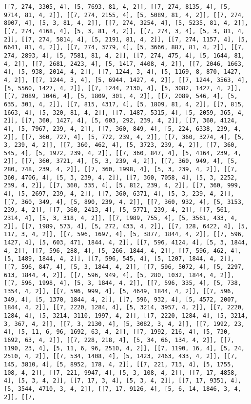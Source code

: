 \documentclass[12pt,fleqn]{article}\usepackage{../../common}
\begin{document}
\begin{verbatim}
[[7, 274, 3305, 4], [5, 7693, 81, 4, 2]], [[7, 274, 8135, 4], [5, 9714, 81, 4, 2]], [[7, 274, 2155, 4], [5, 5089, 81, 4, 2]], [[7, 274, 8907, 4], [5, 3, 81, 4, 2]], [[7, 274, 3254, 4], [5, 5235, 81, 4, 2]], [[7, 274, 4168, 4], [5, 3, 81, 4, 2]], [[7, 274, 3, 4], [5, 3, 81, 4, 2]], [[7, 274, 5814, 4], [5, 2191, 81, 4, 2]], [[7, 274, 1157, 4], [5, 6641, 81, 4, 2]], [[7, 274, 3779, 4], [5, 3666, 887, 81, 4, 2]], [[7, 274, 2893, 4], [5, 7581, 81, 4, 2]], [[7, 274, 475, 4], [5, 1644, 81, 4, 2]], [[7, 2681, 2423, 4], [5, 1417, 4408, 4, 2]], [[7, 2046, 1663, 4], [5, 938, 2014, 4, 2]], [[7, 1244, 3, 4], [5, 1169, 8, 870, 1427, 4, 2]], [[7, 1244, 3, 4], [5, 6944, 1427, 4, 2]], [[7, 1244, 3563, 4], [5, 5560, 1427, 4, 2]], [[7, 1244, 2130, 4], [5, 3082, 1427, 4, 2]], [[7, 2089, 1046, 4], [5, 1809, 301, 4, 2]], [[7, 2089, 546, 4], [5, 635, 301, 4, 2]], [[7, 815, 4317, 4], [5, 1809, 81, 4, 2]], [[7, 815, 1663, 4], [5, 320, 81, 4, 2]], [[7, 1487, 5315, 4], [5, 2059, 365, 4, 2]], [[7, 360, 1427, 4], [5, 603, 292, 239, 4, 2]], [[7, 360, 4124, 4], [5, 7967, 239, 4, 2]], [[7, 360, 849, 4], [5, 224, 6338, 239, 4, 2]], [[7, 360, 727, 4], [5, 772, 239, 4, 2]], [[7, 360, 3274, 4], [5, 3, 239, 4, 2]], [[7, 360, 462, 4], [5, 3723, 239, 4, 2]], [[7, 360, 545, 4], [5, 1972, 239, 4, 2]], [[7, 360, 847, 4], [5, 4164, 239, 4, 2]], [[7, 360, 3721, 4], [5, 3, 239, 4, 2]], [[7, 360, 949, 4], [5, 280, 748, 239, 4, 2]], [[7, 360, 1998, 4], [5, 3, 239, 4, 2]], [[7, 360, 4706, 4], [5, 3, 239, 4, 2]], [[7, 360, 7058, 4], [5, 3, 2252, 239, 4, 2]], [[7, 360, 335, 4], [5, 812, 239, 4, 2]], [[7, 360, 999, 4], [5, 2697, 239, 4, 2]], [[7, 360, 6371, 4], [5, 3, 239, 4, 2]], [[7, 360, 349, 4], [5, 890, 239, 4, 2]], [[7, 360, 932, 4], [5, 3153, 239, 4, 2]], [[7, 360, 2413, 4], [5, 5771, 239, 4, 2]], [[7, 561, 2314, 4], [5, 3, 318, 4, 2]], [[7, 1989, 755, 4], [5, 3561, 433, 4, 2]], [[7, 1989, 573, 4], [5, 272, 433, 4, 2]], [[7, 128, 6422, 4], [5, 117, 3, 4, 2]], [[7, 596, 1697, 4], [5, 3877, 1844, 4, 2]], [[7, 596, 1427, 4], [5, 603, 471, 1844, 4, 2]], [[7, 596, 4124, 4], [5, 3, 1844, 4, 2]], [[7, 596, 288, 4], [5, 266, 1844, 4, 2]], [[7, 596, 462, 4], [5, 1489, 1844, 4, 2]], [[7, 596, 545, 4], [5, 1207, 1844, 4, 2]], [[7, 596, 847, 4], [5, 3, 1844, 4, 2]], [[7, 596, 5072, 4], [5, 2297, 613, 1844, 4, 2]], [[7, 596, 949, 4], [5, 280, 1032, 1844, 4, 2]], [[7, 596, 1998, 4], [5, 3, 1844, 4, 2]], [[7, 596, 335, 4], [5, 738, 1354, 4, 2]], [[7, 596, 999, 4], [5, 4649, 1844, 4, 2]], [[7, 596, 349, 4], [5, 1370, 1844, 4, 2]], [[7, 596, 932, 4], [5, 4572, 2007, 1844, 4, 2]], [[7, 2220, 1284, 4], [5, 3214, 3957, 4, 2]], [[7, 2220, 1284, 4], [5, 3214, 3110, 1997, 4, 2]], [[7, 2220, 1284, 4], [5, 3214, 3, 367, 4, 2]], [[7, 3, 2130, 4], [5, 3082, 3, 4, 2]], [[7, 1992, 23, 4], [5, 11, 6, 96, 1692, 63, 4, 2]], [[7, 1992, 216, 4], [5, 730, 1692, 63, 4, 2]], [[7, 228, 218, 4], [5, 34, 66, 134, 4, 2]], [[7, 1190, 23, 4], [5, 11, 6, 96, 2510, 4, 2]], [[7, 1190, 16, 4], [5, 24, 2510, 4, 2]], [[7, 534, 1408, 4], [5, 1423, 2463, 433, 4, 2]], [[7, 145, 3810, 4], [5, 8952, 178, 4, 2]], [[7, 221, 713, 4], [5, 1755, 108, 4, 2]], [[7, 221, 9947, 4], [5, 3, 108, 4, 2]], [[7, 17, 4858, 4], [5, 3, 4, 2]], [[7, 17, 3, 4], [5, 3, 4, 2]], [[7, 17, 9351, 4], [5, 3544, 4710, 3, 4, 2]], [[7, 17, 9126, 4], [5, 6, 14, 1846, 3, 4, 2]], [[7, 
\end{verbatim}
\end{document}
